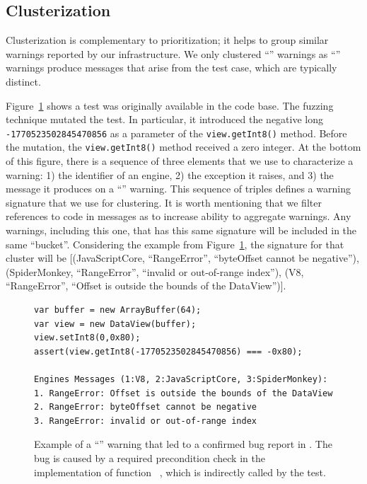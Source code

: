 \documentclass[smallextended]{svjour3}
\begin{document}
\subsection{Clusterization}
\label{sec:clusterization}


Clusterization is complementary to prioritization; it helps to group
similar warnings reported by our infrastructure. We only clustered
``\lo'' warnings as ``\hi'' warnings produce messages that arise from
the test case, which are typically distinct.

Figure~\ref{fig:lo-truepositive} shows a test was originally
available in the \jsc code base.  The \radamsa fuzzing technique
mutated the test. In particular, it introduced the negative
long \texttt{-1770523502845470856} as a parameter of the
\texttt{view.getInt8()} method. Before the mutation, the
\texttt{view.getInt8()} method received a zero integer.
At the bottom of this figure, there is a sequence of
three elements that we use to characterize a warning: 1) the
identifier of an engine, 2) the exception it raises, and 3) the
message it produces on a ``\lo'' warning.  This sequence of triples
defines a warning signature that we use for clustering. It is worth
mentioning that we filter references to code in messages as to
increase ability to aggregate warnings. Any warnings, including this
one, that has this same signature will be included in the same
``bucket''. Considering the example from
Figure~\ref{fig:lo-truepositive}, the signature for that cluster will
be [(JavaScriptCore, ``RangeError'', ``byteOffset cannot be
  negative''), (SpiderMonkey, ``RangeError'', ``invalid or
  out-of-range index''), (V8, ``RangeError'', ``Offset is outside the
  bounds of the DataView'')].

\begin{figure}[t!]
  \centering
  \begin{lstlisting}
var buffer = new ArrayBuffer(64);
var view = new DataView(buffer);
view.setInt8(0,0x80);
assert(view.getInt8(-1770523502845470856) === -0x80);

Engines Messages (1:V8, 2:JavaScriptCore, 3:SpiderMonkey):
1. RangeError: Offset is outside the bounds of the DataView
2. RangeError: byteOffset cannot be negative
3. RangeError: invalid or out-of-range index
  \end{lstlisting}
  \caption{\label{fig:lo-truepositive}Example of a ``\lo'' warning
    that led to a confirmed bug report in \chakra. The bug is caused
    by a required precondition check in the implementation of function
    ~\cite{ecmas262-getviewvalue}, which is indirectly called by the test. }
\end{figure}
\end{document}
